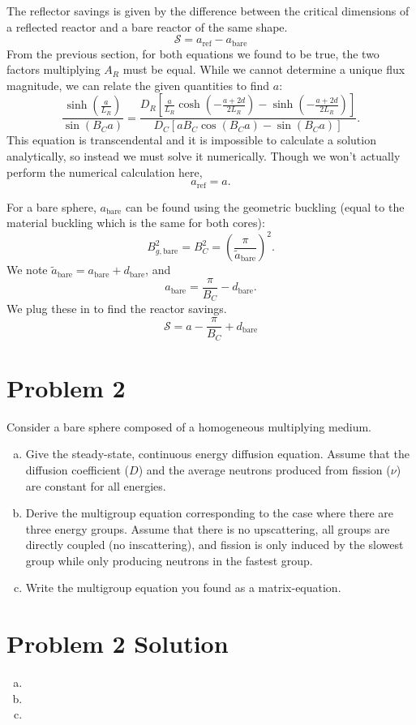 \documentclass{report}
\begin{document}
\begin{enumerate}[a)]
The reflector savings is given by the difference between the critical dimensions of a reflected reactor and a bare reactor of the same shape.
$$ \mathcal{S} = a_{\text{ref}} - a_{\text{bare}} $$
From the previous section, for both equations we found to be true, the two factors multiplying $A_R$ must be equal. While we cannot determine a unique flux magnitude, we can relate the given quantities to find $a$:
$$ \frac{\sinh\left(\frac{a}{L_R}\right)}{\sin\left(B_C a\right)} = \frac{D_R \left[\frac{a}{L_R}\cosh\left(-\frac{a+2d}{2L_R}\right) - \sinh\left(-\frac{a+2d}{2L_R}\right)\right]}{D_C \left[a B_C \cos\left(B_C a\right) - \sin\left(B_C a\right)\right]}.$$
This equation is transcendental and it is impossible to calculate a solution analytically, so instead we must solve it numerically. Though we won't actually perform the numerical calculation here,
$$ a_{\text{ref}} = a .$$

For a bare sphere, $a_{\text{bare}}$ can be found using the geometric buckling (equal to the material buckling which is the same for both cores): 
$$ B_{g,\text{bare}}^2 = B_C^2 = \left(\frac{\pi}{\tilde{a}_{\text{bare}}}\right)^2 .$$
We note $\tilde{a}_{\text{bare}} = a_{\text{bare}} + d_{\text{bare}}$, and 
$$ a_{\text{bare}} = \frac{\pi}{B_C} - d_{\text{bare}} .$$
We plug these in to find the reactor savings.
$$\boxed{ \mathcal{S} = a - \frac{\pi}{B_C} + d_{\text{bare}} }$$
\end{enumerate}


\newpage
\section*{Problem 2}

Consider a bare sphere composed of a homogeneous multiplying medium.
\begin{enumerate}[a)]
\item Give the steady-state, continuous energy diffusion equation. Assume that the diffusion coefficient ($D$) and the average neutrons produced from fission ($\nu$) are constant for all energies.
\item Derive the multigroup equation corresponding to the case where there are three energy groups. Assume that there is no upscattering, all groups are directly coupled (no inscattering), and fission is only induced by the slowest group while only producing neutrons in the fastest group.
\item Write the multigroup equation you found as a matrix-equation.
\end{enumerate}



\section*{Problem 2 Solution}

\begin{enumerate}[a)]

\item 
\item
\item

\end{enumerate}
\end{document}
